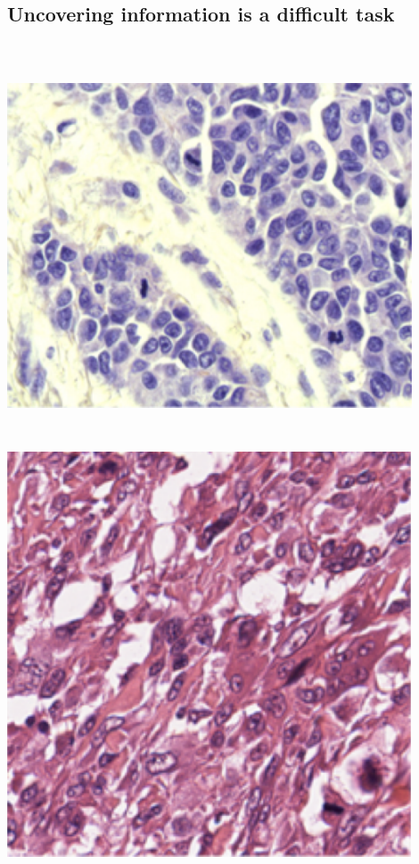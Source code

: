 \documentclass[a0,portrait]{a0poster}
\begin{document}
\begin{multicols}{2}
\section*{Uncovering information is a difficult task}

\begin{center}

  \includegraphics[height=12cm, width = 12cm]{histo1.png}
  \includegraphics[height=12cm, width = 12cm]{histo2.png}

\end{center}
\end{multicols}
\end{document}
